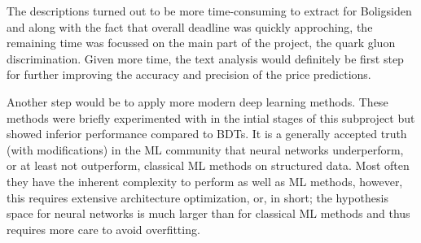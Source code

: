 The descriptions turned out to be more time-consuming to extract for Boligsiden and along with the fact that overall deadline was quickly approching, the remaining time was focussed on the main part of the project, the quark gluon discrimination. Given more time, the text analysis would definitely be first step for further improving the accuracy and precision of the price predictions. 

Another step would be to apply more modern deep learning methods. These methods were briefly experimented with in the intial stages of this subproject but showed inferior performance compared to BDTs. It is a generally accepted truth (with modifications) in the ML community that neural networks underperform, or at least not outperform, classical ML methods on structured data. Most often they have the inherent complexity to perform as well as ML methods, however, this requires extensive architecture optimization, or, in short; the hypothesis space for neural networks is much larger than for classical ML methods and thus requires more care to avoid overfitting.